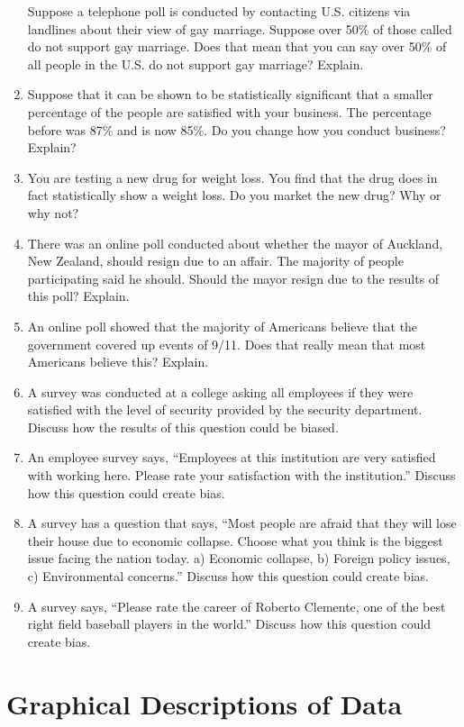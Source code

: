 \documentclass[]{book}
\begin{document}
\begin{enumerate}
  Suppose a telephone poll is conducted by contacting U.S. citizens
  via landlines about their view of gay marriage. Suppose over 50\% of
  those called do not support gay marriage. Does that mean that you
  can say over 50\% of all people in the U.S. do not support gay
  marriage? Explain.
\item
  Suppose that it can be shown to be statistically significant that a
  smaller percentage of the people are satisfied with your business.
  The percentage before was 87\% and is now 85\%. Do you change how you
  conduct business? Explain?
\item
  You are testing a new drug for weight loss. You find that the drug
  does in fact statistically show a weight loss. Do you market the new
  drug? Why or why not?
\item
  There was an online poll conducted about whether the mayor of
  Auckland, New Zealand, should resign due to an affair. The majority
  of people participating said he should. Should the mayor resign due
  to the results of this poll? Explain.
\item
  An online poll showed that the majority of Americans believe that
  the government covered up events of 9/11. Does that really mean that
  most Americans believe this? Explain.
\item
  A survey was conducted at a college asking all employees if they
  were satisfied with the level of security provided by the security
  department. Discuss how the results of this question could be
  biased.
\item
  An employee survey says, ``Employees at this institution are very
  satisfied with working here. Please rate your satisfaction with the
  institution.'' Discuss how this question could create bias.
\item
  A survey has a question that says, ``Most people are afraid that they
  will lose their house due to economic collapse. Choose what you
  think is the biggest issue facing the nation today. a) Economic
  collapse, b) Foreign policy issues, c) Environmental concerns.''
  Discuss how this question could create bias.
\item
  A survey says, ``Please rate the career of Roberto Clemente, one of
  the best right field baseball players in the world.'' Discuss how
  this question could create bias.
\end{enumerate}

\hypertarget{graphical-descriptions-of-data}{%
\chapter{Graphical Descriptions of Data}\label{graphical-descriptions-of-data}}
\end{document}
